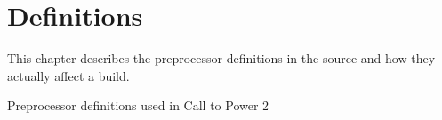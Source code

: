 \chapter{Definitions\label{cha:definitions}}
This chapter describes the preprocessor definitions in the source and how they actually affect a build.
\begin{section}{Preprocessor definitions used in Call to Power 2}

\newlength{\cdefheading}
\setlength{\cdefheading}{25mm}
\newlength{\cdeftext}
\setlength{\cdeftext}{\textwidth}
\addtolength{\cdeftext}{-\cdefheading}
\addtolength{\cdeftext}{-\tabcolsep}
\addtolength{\cdeftext}{-\tabcolsep}

\newcommand{\begincdefinitions}[1]{
	\begin{subsection}{#1}
	\begin{longtable}{p{\cdefheading}@{}p{\cdeftext}}
}
\newcommand{\addcdefinition}[4]{\hypertarget{def:#2}{}\\*
	\multicolumn{2}{l}{\textbf{#1}}\\*
	\textit{Default:}&#4\\*
	\textit{Description:}&#3\\
}
\newcommand{\termcdefinitions}[0]{
	\end{longtable}
	\end{subsection}
}


\end{section}
